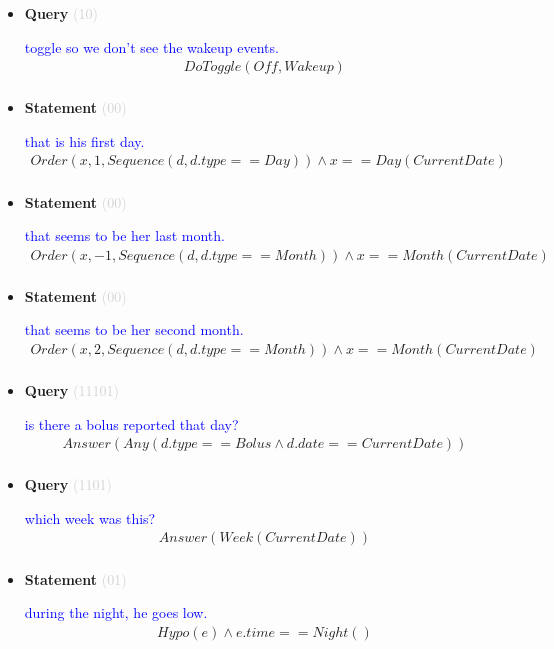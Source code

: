 \documentclass[11pt]{article}
\newcommand{\key}[1]{\textcolor{lightgray}{#1}}
\newcounter{CQuery}
\newcounter{CStatement}
\begin{document}
\begin{itemize}
\item
\textbf{Query\theCQuery} \key{(10)} \addtocounter{CQuery}{1}
\textcolor{blue}{ toggle so we don't see the wakeup events. }
\begin{multline*}
DoToggle(Off, Wakeup) \\ 
\end{multline*}


\item
\textbf{Statement\theCStatement} \key{(00)} \addtocounter{CStatement}{1}
\textcolor{blue}{ that is his first day. }
\begin{multline*}
Order(x, 1, Sequence(d, d.type==Day)) \wedge x==Day(CurrentDate) \\ 
\end{multline*}


\item
\textbf{Statement\theCStatement} \key{(00)} \addtocounter{CStatement}{1}
\textcolor{blue}{ that seems to be her last month. }
\begin{multline*}
Order(x, -1, Sequence(d, d.type==Month)) \wedge x==Month(CurrentDate) \\ 
\end{multline*}


\item
\textbf{Statement\theCStatement} \key{(00)} \addtocounter{CStatement}{1}
\textcolor{blue}{ that seems to be her second month. }
\begin{multline*}
Order(x, 2, Sequence(d, d.type==Month)) \wedge x==Month(CurrentDate) \\ 
\end{multline*}


\item
\textbf{Query\theCQuery} \key{(11101)} \addtocounter{CQuery}{1}
\textcolor{blue}{ is there a bolus reported that day? }
\begin{multline*}
Answer(Any(d.type==Bolus \wedge d.date==CurrentDate)) \\ 
\end{multline*}


\item
\textbf{Query\theCQuery} \key{(1101)} \addtocounter{CQuery}{1}
\textcolor{blue}{ which week was this? }
\begin{multline*}
Answer(Week(CurrentDate)) \\ 
\end{multline*}


\item
\textbf{Statement\theCStatement} \key{(01)} \addtocounter{CStatement}{1}
\textcolor{blue}{ during the night, he goes low. }
\begin{multline*}
Hypo(e) \wedge e.time==Night() \\ 
\end{multline*}



\end{itemize}
\end{document}

